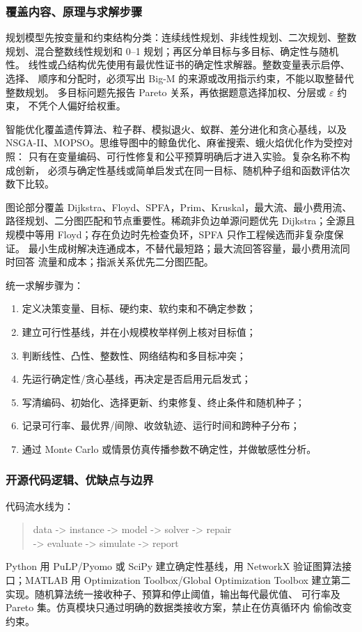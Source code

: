 \documentclass[UTF8,a4paper,12pt]{ctexart}
\begin{document}
\subsubsection{覆盖内容、原理与求解步骤}

规划模型先按变量和约束结构分类：连续线性规划、非线性规划、二次规划、整数
规划、混合整数线性规划和 0--1 规划；再区分单目标与多目标、确定性与随机性。
线性或凸结构优先使用有最优性证书的确定性求解器。整数变量表示启停、选择、
顺序和分配时，必须写出 Big-M 的来源或改用指示约束，不能以取整替代整数规划。
多目标问题先报告 Pareto 关系，再依据题意选择加权、分层或 $\varepsilon$ 约束，
不凭个人偏好给权重。

智能优化覆盖遗传算法、粒子群、模拟退火、蚁群、差分进化和贪心基线，以及
NSGA-II、MOPSO。思维导图中的鲸鱼优化、麻雀搜索、蛾火焰优化作为受控对照：
只有在变量编码、可行性修复和公平预算明确后才进入实验。复杂名称不构成创新，
必须与确定性基线或简单启发式在同一目标、随机种子组和函数评估次数下比较。

图论部分覆盖 Dijkstra、Floyd、SPFA，Prim、Kruskal，最大流、最小费用流、
路径规划、二分图匹配和节点重要性。稀疏非负边单源问题优先 Dijkstra；全源且
规模中等用 Floyd；存在负边时先检查负环，SPFA 只作工程候选而非复杂度保证。
最小生成树解决连通成本，不替代最短路；最大流回答容量，最小费用流同时回答
流量和成本；指派关系优先二分图匹配。

统一求解步骤为：
\begin{enumerate}
  \item 定义决策变量、目标、硬约束、软约束和不确定参数；
  \item 建立可行性基线，并在小规模枚举样例上核对目标值；
  \item 判断线性、凸性、整数性、网络结构和多目标冲突；
  \item 先运行确定性/贪心基线，再决定是否启用元启发式；
  \item 写清编码、初始化、选择更新、约束修复、终止条件和随机种子；
  \item 记录可行率、最优界/间隙、收敛轨迹、运行时间和跨种子分布；
  \item 通过 Monte Carlo 或情景仿真传播参数不确定性，并做敏感性分析。
\end{enumerate}

\subsubsection{开源代码逻辑、优缺点与边界}

代码流水线为：
\begin{quote}
\small\ttfamily
data -> instance -> model -> solver -> repair\\
-> evaluate -> simulate -> report
\end{quote}
Python 用 PuLP/Pyomo 或 SciPy 建立确定性基线，用
NetworkX 验证图算法接口；MATLAB 用 Optimization Toolbox/Global Optimization
Toolbox 建立第二实现。随机算法统一接收种子、预算和停止阈值，输出每代最优值、
可行率及 Pareto 集。仿真模块只通过明确的数据类接收方案，禁止在仿真循环内
偷偷改变约束。
\end{document}

